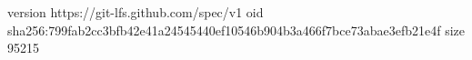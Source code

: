 version https://git-lfs.github.com/spec/v1
oid sha256:799fab2cc3bfb42e41a24545440ef10546b904b3a466f7bce73abae3efb21e4f
size 95215
